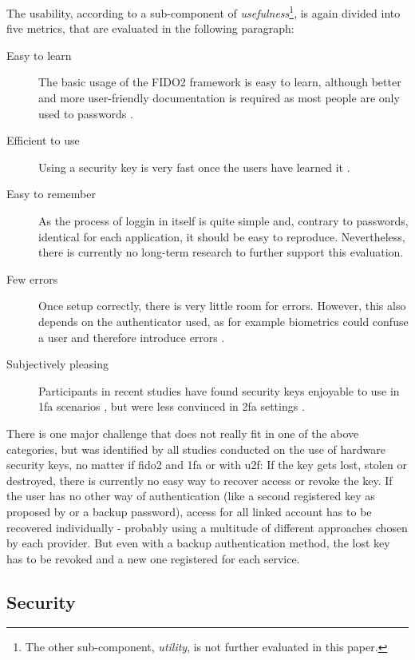 The usability, according to \cite[25 \psq]{nielsen1993} a sub-component of \emph{usefulness}\footnote{The other sub-component, \emph{utility}, is not further evaluated in this paper.}, is again divided into five metrics, that are evaluated in the following paragraph:

\begin{description}
    \item[Easy to learn] The basic usage of the FIDO2 framework is easy to learn, although better and more user-friendly documentation is required as most people are only used to passwords \cite{lyastani2020,hunt2018b,das2018}.
    \item[Efficient to use] Using a security key is very fast once the users have learned it \cite{lang2017}.
    \item[Easy to remember] As the process of loggin in itself is quite simple and, contrary to passwords, identical for each application, it should be easy to reproduce. Nevertheless, there is currently no long-term research to further support this evaluation.
    \item[Few errors] Once setup correctly, there is very little room for errors. However, this also depends on the authenticator used, as for example biometrics could confuse a user and therefore introduce errors \cite{lyastani2020}.
    \item[Subjectively pleasing] Participants in recent studies have found security keys enjoyable to use in \ac{1fa} scenarios \citep{lyastani2020}, but were less convinced in \ac{2fa} settings \cite{das2018}.
\end{description}

There is one major challenge that does not really fit in one of the above categories, but was identified by all studies conducted on the use of hardware security keys, no matter if \ac{fido2} and \ac{1fa} or with \ac{u2f}: If the key gets lost, stolen or destroyed, there is currently no easy way to recover access or revoke the key. If the user has no other way of authentication (like a second registered key as proposed by \cite{gomi2019} or a backup password), access for all linked account has to be recovered individually - probably using a multitude of different approaches chosen by each provider. But even with a backup authentication method, the lost key has to be revoked and a new one registered for each service.\\


\subsection{Security}
\label{subsec:security}

